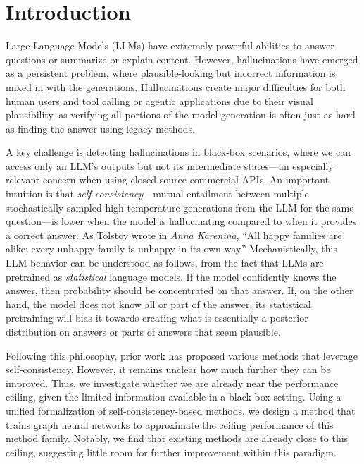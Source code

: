 \section{Introduction}
Large Language Models (LLMs) have extremely powerful abilities to answer questions or summarize or explain content. However, hallucinations have emerged as a persistent problem, where plausible-looking but incorrect information is mixed in with the generations. Hallucinations create major difficulties for both human users and tool calling or agentic applications due to their visual plausibility, as verifying all portions of the model generation is often just as hard as finding the answer using legacy methods. 

A key challenge is detecting hallucinations in black-box scenarios, where we can access only an LLM's outputs but not its intermediate states—an especially relevant concern when using closed-source commercial APIs. An important intuition is that \emph{self-consistency}—mutual entailment between multiple stochastically sampled high-temperature generations from the LLM for the same question—is lower when the model is hallucinating compared to when it provides a correct answer. As Tolstoy wrote in \emph{Anna Karenina}, ``All happy families are alike; every unhappy family is unhappy in its own way.'' Mechanistically, this LLM behavior can be understood as follows, from the fact that LLMs are pretrained as \emph{statistical} language models. If the model confidently knows the answer, then probability should be concentrated on that answer. If, on the other hand, the model does not know all or part of the answer, its statistical pretraining will bias it towards creating what is essentially a posterior distribution on answers or parts of answers that seem plausible.

Following this philosophy, prior work \cite{manakul2023selfcheckgpt,farquhar2024detecting,kuhn2023semantic,lin2023generating,nikitin2024kernel} has proposed various methods that leverage self-consistency. However, it remains unclear how much further they can be improved. Thus, we investigate whether we are already near the performance ceiling, given the limited information available in a black-box setting. Using a unified formalization of self-consistency-based methods, we design a method that trains graph neural networks to approximate the ceiling performance of this method family. Notably, we find that existing methods are already close to this ceiling, suggesting little room for further improvement within this paradigm.



